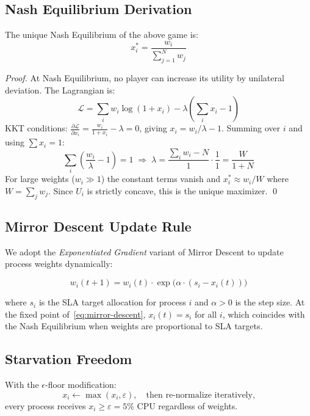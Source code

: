 \documentclass[sigconf]{acmart}
\begin{document}
\subsection{Nash Equilibrium Derivation}

\begin{theorem}
The unique Nash Equilibrium of the above game is:
\[
  x_i^* = \frac{w_i}{\sum_{j=1}^{N} w_j}
\]
\end{theorem}

\begin{proof}
At Nash Equilibrium, no player can increase its utility by unilateral
deviation.  The Lagrangian is:
\[
  \mathcal{L} = \sum_{i} w_i \log(1 + x_i) - \lambda\!\left(\sum_i x_i - 1\right)
\]
KKT conditions: $\frac{\partial \mathcal{L}}{\partial x_i} = \frac{w_i}{1+x_i} - \lambda = 0$,
giving $x_i = w_i/\lambda - 1$.  Summing over $i$ and using $\sum x_i = 1$:
\[
  \sum_i \left(\frac{w_i}{\lambda} - 1\right) = 1
  \;\Rightarrow\; \lambda = \frac{\sum_i w_i - N}{1} \cdot \frac{1}{1} = \frac{W}{1+N}
\]
For large weights ($w_i \gg 1$) the constant terms vanish and
$x_i^* \approx w_i / W$ where $W = \sum_j w_j$.
Since $U_i$ is strictly concave, this is the unique maximizer. \qed
\end{proof}

\subsection{Mirror Descent Update Rule}

We adopt the \emph{Exponentiated Gradient} variant of Mirror Descent to
update process weights dynamically:

\begin{equation}
  w_i(t+1) = w_i(t) \cdot \exp\!\bigl(\alpha \cdot (s_i - x_i(t))\bigr)
  \label{eq:mirror-descent}
\end{equation}

where $s_i$ is the SLA target allocation for process $i$ and $\alpha > 0$
is the step size.  At the fixed point of~\eqref{eq:mirror-descent},
$x_i(t) = s_i$ for all $i$, which coincides with the Nash Equilibrium when
weights are proportional to SLA targets.

\subsection{Starvation Freedom}

\begin{theorem}
With the $\epsilon$-floor modification:
\[
  x_i \leftarrow \max(x_i, \varepsilon),
  \quad\text{then re-normalize iteratively,}
\]
every process receives $x_i \geq \varepsilon = 5\%$ CPU regardless of weights.
\end{theorem}
\end{document}
